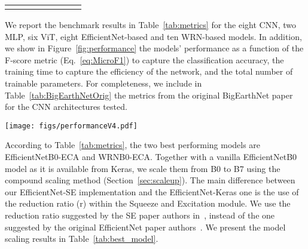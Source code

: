 \documentclass[journal]{IEEEtran}
\begin{document}
\begin{table*}[h!]
\begin{tabular}{c c c c c c c c}
 \bottomrule \\
\end{tabular}
\caption{Results of the benchmark, conducted with the distributed learning framework, for the eight CNN, two MLP, six transformer, eight EfficientNet-based, and ten WRN-based models. ResNet50 metrics correspond to the ResNet50 model when trained in one GPU only. For each model family, we highlight in bold the best metric achieved, concerning F-Score, training time, and inference rate. EfficientNetB0-ECA and WRNB0-EC, in bold, are the two best performing models in the benchmark, which we select to scale through compound scaling (Section~\ref{sec:scaleup}).}
\label{tab:metrics}
\end{table*}


We report the benchmark results in Table~\ref{tab:metrics} for the eight CNN, two MLP, six ViT, eight EfficientNet-based and ten WRN-based models. In addition, we show in Figure~\ref{fig:performance} the models' performance as a function of the F-score metric (Eq.~\ref{eq:MicroF1}) to capture the classification accuracy, the training time to capture the efficiency of the network, and the total number of trainable parameters. For completeness, we include in Table~\ref{tab:BigEarthNetOrig} the metrics from the original BigEarthNet paper~\citep{sumbul2020bigearthnet} for the CNN architectures tested. 

\begin{figure*}[ht]

 \texttt{[image: figs/performanceV4.pdf]}
\caption{Performance vs training time trade-off for the different models evaluated. All models of Table~\ref{tab:metrics} are included, plus our best performing model of Table~\ref{tab:best_model}: WRN-B4-ECA. The size of the bubbles is proportional to the size of the model. Training time is estimated on a cluster of 20 Tesla K40 GPUs.}
\label{fig:performance}
\end{figure*}

According to Table~\ref{tab:metrics}, the two best performing models are EfficientNetB0-ECA and WRNB0-ECA. Together with a vanilla EfficientNetB0 model as it is available from Keras, we scale them from B0 to B7 using the compound scaling method (Section~\ref{sec:scaleup}). 
The main difference between our EfficientNet-SE implementation and the EfficientNet-Keras one is the use of the reduction ratio (r) within the Squeeze and Excitation module. We use the reduction ratio suggested by the SE paper authors in~\cite{Hu_2018_CVPR}, instead of the one suggested by the original EfficientNet paper authors~\citep{pmlr-v97-tan19a}.
We present the model scaling results in Table~\ref{tab:best_model}.
\end{document}
